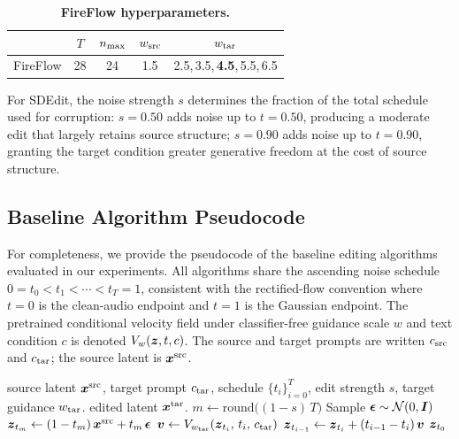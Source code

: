 \begin{table}[htpb]
    \centering
    \small
    \begin{tabular}{@{}ccccc@{}}
        \toprule
        & $T$ & $n_{\max}$ & $w_{\mathrm{src}}$ & $w_{\mathrm{tar}}$ \\
        \midrule
        FireFlow & 28 & 24 & 1.5 & 2.5,\,3.5,\,\textbf{4.5},\,5.5,\,6.5 \\
        \bottomrule
    \end{tabular}
    \caption{\textbf{FireFlow hyperparameters.}}
    \label{tab:hyperparams-fireflow}
\end{table}

For SDEdit, the noise strength $s$ determines the fraction of the total schedule used for corruption: $s=0.50$ adds noise up to $t=0.50$, producing a moderate edit that largely retains source structure; $s=0.90$ adds noise up to $t=0.90$, granting the target condition greater generative freedom at the cost of source structure.

\subsection{Baseline Algorithm Pseudocode}
\label{app:baseline_pseudocode}

For completeness, we provide the pseudocode of the baseline editing algorithms evaluated in our experiments.
All algorithms share the ascending noise schedule $0=t_0<t_1<\cdots<t_T=1$, consistent with the rectified-flow convention where $t=0$ is the clean-audio endpoint and $t=1$ is the Gaussian endpoint.
The pretrained conditional velocity field under classifier-free guidance scale $w$ and text condition $c$ is denoted $V_{w}(\boldsymbol{z},t,c)$.
The source and target prompts are written $c_{\mathrm{src}}$ and $c_{\mathrm{tar}}$; the source latent is $\boldsymbol{x}^{\mathrm{src}}$.

\begin{algorithm}[htpb]
    \caption{\textbf{SDEdit} --- Single-pass noising and denoising.}
    \label{alg:sdedit}
    \begin{algorithmic}[1]
     source latent $\boldsymbol{x}^{\mathrm{src}}$, target prompt $c_{\mathrm{tar}}$, schedule $\{t_i\}_{i=0}^{T}$, edit strength $s$, target guidance $w_{\mathrm{tar}}$.
     edited latent $\boldsymbol{x}^{\mathrm{tar}}$.
    \State $m \leftarrow \mathrm{round}\big((1-s)\,T\big)$
    \State Sample $\boldsymbol{\epsilon}\sim\mathcal{N}(0,\boldsymbol{I})$
    \State $\boldsymbol{z}_{t_m} \leftarrow (1-t_m)\,\boldsymbol{x}^{\mathrm{src}} + t_m\,\boldsymbol{\epsilon}$
        \State $\boldsymbol{v} \leftarrow V_{w_{\mathrm{tar}}}(\boldsymbol{z}_{t_i},\,t_i,\,c_{\mathrm{tar}})$
        \State $\boldsymbol{z}_{t_{i-1}} \leftarrow \boldsymbol{z}_{t_i} + (t_{i-1}-t_i)\,\boldsymbol{v}$
    \EndFor
    \State \Return $\boldsymbol{z}_{t_0}$
    \end{algorithmic}
\end{algorithm}

